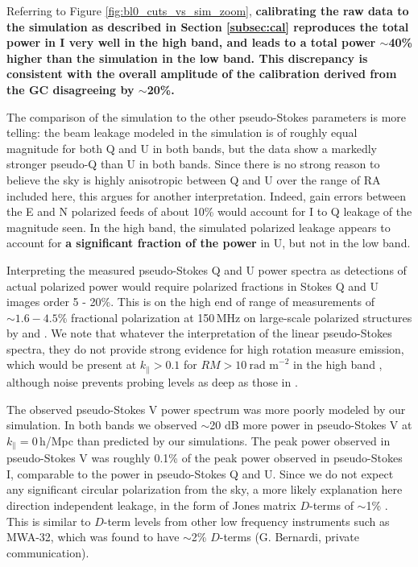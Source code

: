 \documentclass[twocolumn, trackchanges]{aastex61}
\newcommand{\edited}[1]{{\bf \color{blue} #1}}
\begin{document}
Referring to Figure \ref{fig:bl0_cuts_vs_sim_zoom}, \edited{calibrating the raw
  data to the simulation as described in Section \ref{subsec:cal} reproduces the
  total power in I very well in the high band, and leads to a total power
  $\sim$40\% higher than the simulation in the low band. This discrepancy is
  consistent with the overall amplitude of the calibration derived from the GC
  disagreeing by $\sim$20\%.}

The comparison of the simulation to the other pseudo-Stokes parameters is more
telling: the beam leakage modeled in the simulation is of roughly equal
magnitude for both Q and U in both bands, but the data show a markedly stronger
pseudo-Q than U in both bands.  Since there is no strong reason to believe the
sky is highly anisotropic between Q and U over the range of RA included here,
this argues for another interpretation.  Indeed, gain errors between the E and N
polarized feeds of about 10\% would account for I to Q leakage of the magnitude
seen.  In the high band, the simulated polarized leakage appears to account for
\edited{a significant fraction of the power} in U, but not in the low band.

Interpreting the measured pseudo-Stokes Q and U power spectra as detections of
actual polarized power would require polarized fractions in Stokes Q and U
images order 5 - 20\%.  This is on the high end of range of measurements of
$\sim 1.6 - 4.5\%$ fractional polarization at 150\,MHz on large-scale polarized
structures by \cite{Jelic.15} and \cite{Lenc.16}.  We note that whatever the
interpretation of the linear pseudo-Stokes spectra, they do not provide strong
evidence for high rotation measure emission, which would be present at
$k_\parallel > 0.1$ for $RM > 10~\text{rad m}^{-2}$ in the high band
\cite{Moore17}, although noise prevents probing levels as deep as those in
\cite{Asad18}.

The observed pseudo-Stokes V power spectrum was more poorly modeled by our
simulation. In both bands we observed $\sim$20 dB more power in pseudo-Stokes V
at $k_{\parallel}=0$\,h/Mpc than predicted by our simulations. The peak power
observed in pseudo-Stokes V was roughly 0.1\% of the peak power observed in
pseudo-Stokes I, comparable to the power in pseudo-Stokes Q and U.  Since we do
not expect any significant circular polarization from the sky, a more likely
explanation here direction independent leakage, in the form of Jones matrix
$D$-terms of $\sim$1\% \citep{TMS}. This is similar to $D$-term levels from
other low frequency instruments such as MWA-32, which was found to have
$\sim$2\% $D$-terms (G. Bernardi, private communication).
\end{document}
